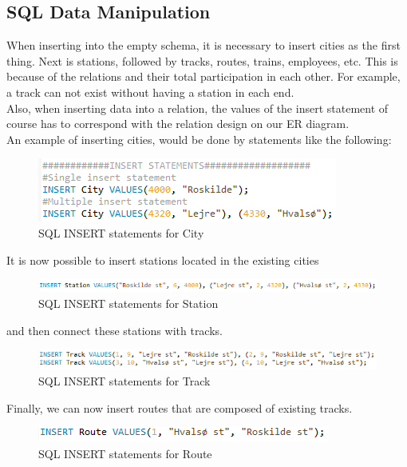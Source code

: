 \newpage
\subsection{SQL Data Manipulation}
When inserting into the empty schema, it is necessary to insert cities as the first thing. Next is stations, followed by tracks, routes, trains, employees, etc. This is because of the relations and their total participation in each other. For example, a track can not exist without having a station in each end.\\
Also, when inserting data into a relation, the values of the insert statement of course has to correspond with the relation design on our ER diagram.\\
An example of inserting cities, would be done by statements like the following:

\begin{figure}[ht!]
    \centering
    \includegraphics[width=.6\textwidth]{img/INSERT_Statements}
    \caption{SQL INSERT statements for City}
\end{figure}

It is now possible to insert stations located in the existing cities

\begin{figure}[ht!]
    \centering
    \includegraphics[width=1\textwidth]{img/INSERT_Statement_Station}
    \caption{SQL INSERT statements for Station}
\end{figure}

and then connect these stations with tracks.

\begin{figure}[ht!]
    \centering
    \includegraphics[width=1\textwidth]{img/INSERT_Statements_Track}
    \caption{SQL INSERT statements for Track}
\end{figure}

Finally, we can now insert routes that are composed of existing tracks.

\begin{figure}[ht!]
    \centering
    \includegraphics[width=.6\textwidth]{img/INSERT_Statements_Route}
    \caption{SQL INSERT statements for Route}
\end{figure}

